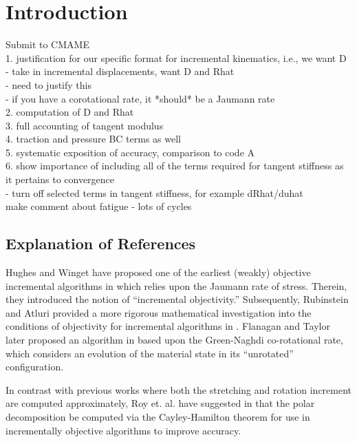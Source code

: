 \section{Introduction}

Submit to CMAME \\

1. justification for our specific format for incremental kinematics, i.e., we want D \\
  - take in incremental displacements, want D and Rhat \\
  - need to justify this \\
  - if you have a corotational rate, it *should* be a Jaumann rate \\
2. computation of D and Rhat \\
3. full accounting of tangent modulus \\
4. traction and pressure BC terms as well \\
5. systematic exposition of accuracy, comparison to code A \\
6. show importance of including all of the terms required for tangent stiffness as it pertains to convergence \\
  - turn off selected terms in tangent stiffness, for example dRhat/duhat \\

make comment about fatigue - lots of cycles

\subsection{Explanation of References}
Hughes and Winget have proposed one of the earliest (weakly) objective incremental algorithms in \cite{hughes1980} which relies upon the Jaumann rate of stress. Therein, they introduced the notion of ``incremental objectivity.'' Subsequently, Rubinstein and Atluri provided a more rigorous mathematical investigation into the conditions of objectivity for incremental algorithms in \cite{rubinstein1983}. Flanagan and Taylor later proposed an algorithm in \cite{flanagan1987} based upon the Green-Naghdi co-rotational rate, which considers an evolution of the material state in its ``unrotated'' configuration.

In contrast with previous works where both the stretching and rotation increment are computed approximately, Roy et. al. have suggested in \cite{roy1992} that the polar decomposition be computed via the Cayley-Hamilton theorem for use in incrementally objective algorithms to improve accuracy.

